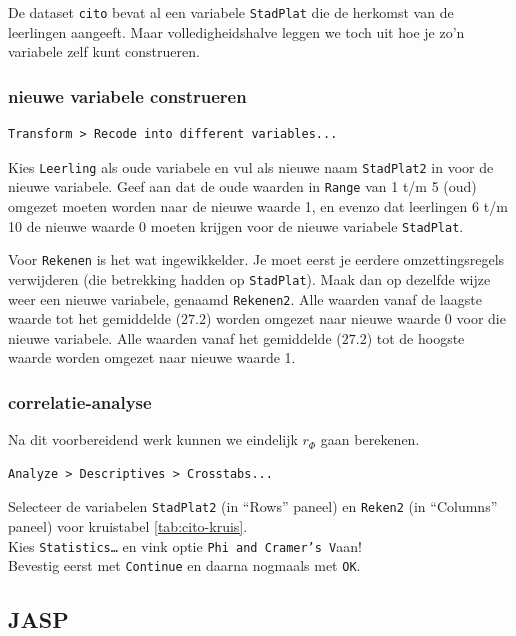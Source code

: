 \documentclass[
]{book}
\begin{document}
De dataset \texttt{cito} bevat al een variabele \texttt{StadPlat} die de herkomst van de leerlingen aangeeft. Maar volledigheidshalve leggen we toch uit hoe je zo'n variabele zelf kunt construeren.

\subsubsection{nieuwe variabele construeren}\label{nieuwe-variabele-construeren}

\begin{verbatim}
Transform > Recode into different variables...
\end{verbatim}

Kies \texttt{Leerling} als oude variabele en vul als nieuwe naam \texttt{StadPlat2}
in voor de nieuwe variabele. Geef aan dat de oude waarden in \texttt{Range} van
1 t/m 5 (oud) omgezet moeten worden naar de nieuwe waarde 1, en evenzo
dat leerlingen 6 t/m 10 de nieuwe waarde 0 moeten krijgen voor de nieuwe
variabele \texttt{StadPlat}.

Voor \texttt{Rekenen} is het wat ingewikkelder. Je moet eerst je eerdere
omzettingsregels verwijderen (die betrekking hadden op \texttt{StadPlat}). Maak
dan op dezelfde wijze weer een nieuwe variabele, genaamd \texttt{Rekenen2}.
Alle waarden vanaf de laagste waarde tot het gemiddelde (\(27.2\)) worden
omgezet naar nieuwe waarde 0 voor die nieuwe variabele. Alle waarden
vanaf het gemiddelde (\(27.2\)) tot de hoogste waarde worden omgezet naar
nieuwe waarde 1.

\subsubsection{correlatie-analyse}\label{correlatie-analyse}

Na dit voorbereidend werk kunnen we eindelijk \(r_\Phi\) gaan berekenen.

\begin{verbatim}
Analyze > Descriptives > Crosstabs...
\end{verbatim}

Selecteer de variabelen \texttt{StadPlat2} (in ``Rows'' paneel) en \texttt{Reken2}
(in ``Columns'' paneel) voor
kruistabel \ref{tab:cito-kruis}.\\
Kies \texttt{Statistics…} en vink optie \texttt{Phi\ and\ Cramer’s\ V}aan!\\
Bevestig eerst met \texttt{Continue} en daarna nogmaals met \texttt{OK}.

\subsection{JASP}\label{jasp-10}
\end{document}
